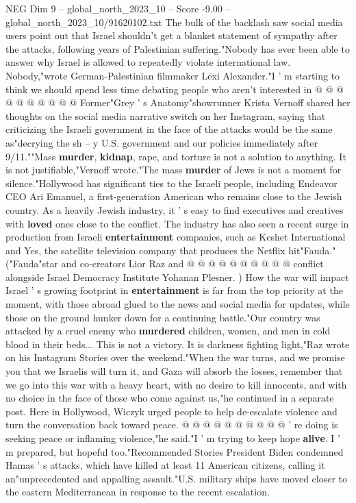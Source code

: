 \begin{textsample}{NEG Dim 9 – global\_north\_2023\_10 – Score -9.00 – global\_north\_2023\_10/91620102.txt}
The bulk of the backlash saw social media users point out that Israel shouldn't get a blanket statement of sympathy after the attacks, following years of Palestinian suffering."Nobody has ever been able to answer why Israel is allowed to repeatedly violate international law.
Nobody,"wrote German-Palestinian filmmaker Lexi Alexander."I ' m starting to think we should spend less time debating people who aren't interested in @ @ @ @ @ @ @ @ @ @ Former"Grey ' s Anatomy"showrunner Krista Vernoff shared her thoughts on the social media narrative switch on her Instagram, saying that criticizing the Israeli government in the face of the attacks would be the same as"decrying the sh -- y U.S. government and our policies immediately after 9/11.""Mass \textbf{murder}, \textbf{kidnap}, rape, and torture is not a solution to anything.
It is not justifiable,"Vernoff wrote."The mass \textbf{murder} of Jews is not a moment for silence."Hollywood has significant ties to the Israeli people, including Endeavor CEO Ari Emanuel, a first-generation American who remains close to the Jewish country.
As a heavily Jewish industry, it ' s easy to find executives and creatives with \textbf{loved} ones close to the conflict.
The industry has also seen a recent surge in production from Israeli \textbf{entertainment} companies, such as Keshet International and Yes, the satellite television company that produces the Netflix hit"Fauda."("Fauda"star and co-creators Lior Raz and @ @ @ @ @ @ @ @ @ @ conflict alongside Israel Democracy Institute Yohanan Plesner. ) How the war will impact Israel ' s growing footprint in \textbf{entertainment} is far from the top priority at the moment, with those abroad glued to the news and social media for updates, while those on the ground hunker down for a continuing battle."Our country was attacked by a cruel enemy who \textbf{murdered} children, women, and men in cold blood in their beds...
This is not a victory.
It is darkness fighting light,"Raz wrote on his Instagram Stories over the weekend."When the war turns, and we promise you that we Israelis will turn it, and Gaza will absorb the losses, remember that we go into this war with a heavy heart, with no desire to kill innocents, and with no choice in the face of those who come against us,"he continued in a separate post.
Here in Hollywood, Wiczyk urged people to help de-escalate violence and turn the conversation back toward peace. @ @ @ @ @ @ @ @ @ @ ' re doing is seeking peace or inflaming violence,"he said."I ' m trying to keep hope \textbf{alive}.
I ' m prepared, but hopeful too."Recommended Stories President Biden condemned Hamas ' s attacks, which have killed at least 11 American citizens, calling it an"unprecedented and appalling assault."U.S. military ships have moved closer to the eastern Mediterranean in response to the recent escalation.

\end{textsample}
